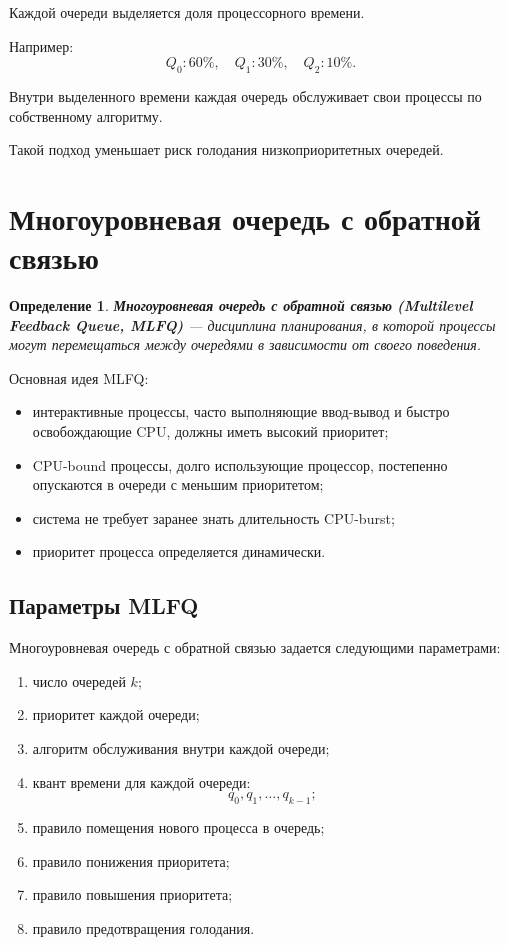 \documentclass[12pt,a4paper]{article}
\newtheorem{definition}{Определение}
\begin{document}
Каждой очереди выделяется доля процессорного времени.

Например:
\[
Q_0: 60\%, \quad Q_1: 30\%, \quad Q_2: 10\%.
\]

Внутри выделенного времени каждая очередь обслуживает свои процессы по собственному алгоритму.

Такой подход уменьшает риск голодания низкоприоритетных очередей.

\section{Многоуровневая очередь с обратной связью}

\begin{definition}
\textbf{Многоуровневая очередь с обратной связью} \textbf{(Multilevel Feedback Queue, MLFQ)} --- дисциплина планирования, в которой процессы могут перемещаться между очередями в зависимости от своего поведения.
\end{definition}

Основная идея MLFQ:
\begin{itemize}
    \item интерактивные процессы, часто выполняющие ввод-вывод и быстро освобождающие CPU, должны иметь высокий приоритет;
    \item CPU-bound процессы, долго использующие процессор, постепенно опускаются в очереди с меньшим приоритетом;
    \item система не требует заранее знать длительность CPU-burst;
    \item приоритет процесса определяется динамически.
\end{itemize}

\subsection{Параметры MLFQ}

Многоуровневая очередь с обратной связью задается следующими параметрами:

\begin{enumerate}
    \item число очередей $k$;
    \item приоритет каждой очереди;
    \item алгоритм обслуживания внутри каждой очереди;
    \item квант времени для каждой очереди:
    \[
    q_0,q_1,\ldots,q_{k-1};
    \]
    \item правило помещения нового процесса в очередь;
    \item правило понижения приоритета;
    \item правило повышения приоритета;
    \item правило предотвращения голодания.
\end{enumerate}
\end{document}
